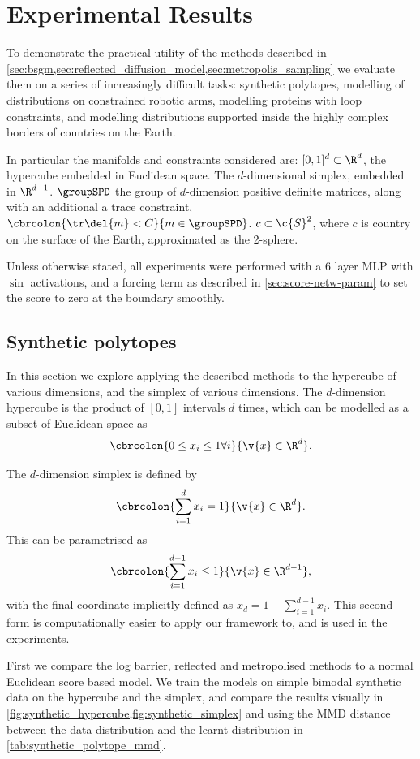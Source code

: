 \section{Experimental Results}
\label{sec:exp_constrained}
To demonstrate the practical utility of the methods described in \cref{sec:bsgm,sec:reflected_diffusion_model,sec:metropolis_sampling} we evaluate them on a series of increasingly difficult tasks: synthetic polytopes, modelling of distributions on constrained robotic arms, modelling proteins with loop constraints, and modelling distributions supported inside the highly complex borders of countries on the Earth.

In particular the manifolds and constraints considered are: \1 \([0,1]^d \subset \R^d\), the hypercube embedded in Euclidean space.
\2 The \(d\)-dimensional simplex, embedded in \(\R^{d-1}\).
\3 \(\groupSPD\) the group of \(d\)-dimension positive definite matrices, along with an additional a trace constraint, \(\cbrcolon{\tr\del{m} < C}{m\in \groupSPD}\).
\4 \(c \subset \c{S}^2\), where \(c\) is country on the surface of the Earth, approximated as the 2-sphere.
\0

Unless otherwise stated, all experiments were performed with a 6 layer MLP with \(\sin\) activations, and a forcing term as described in \cref{sec:score-netw-param} to set the score to zero at the boundary smoothly.

\subsection{Synthetic polytopes}
\label{sec:exp_constrained_polytopes}

In this section we explore applying the described methods to the hypercube of various dimensions, and the simplex of various dimensions.
The \(d\)-dimension hypercube is the product of \([0,1]\) intervals \(d\) times, which can be modelled as a subset of Euclidean space as \[\cbrcolon{0\leq x_i\leq 1 \forall i}{\v{x} \in \R^d}.\]

The \(d\)-dimension simplex is defined by \[\cbrcolon{\sum_{i=1}^d x_i = 1}{\v{x}\in \R^d}.\]
This can be parametrised as \[\cbrcolon{\sum_{i=1}^{d-1} x_i \leq 1}{\v{x}\in \R^{d-1}},\] with the final coordinate implicitly defined as \(x_d = 1 - \sum_{i=1}^{d-1} x_i\).
This second form is computationally easier to apply our framework to, and is used in the experiments.

First we compare the log barrier, reflected and metropolised methods to a normal Euclidean score based model.
We train the models on simple bimodal synthetic data on the hypercube and the simplex, and compare the results visually in \cref{fig:synthetic_hypercube,fig:synthetic_simplex} and using the MMD distance \parencite{gretton2012kernel} between the data distribution and the learnt distribution in \cref{tab:synthetic_polytope_mmd}.

